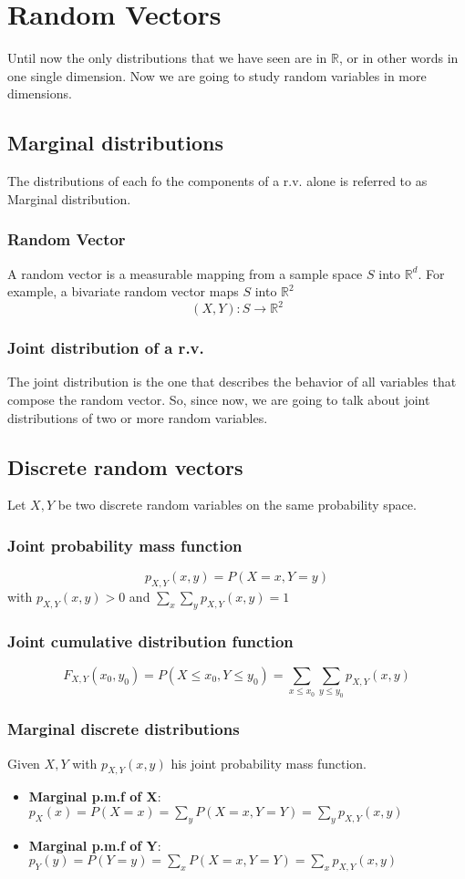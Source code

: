
\section{Random Vectors}
Until now the only distributions that we have seen are in $\mathbb{R}$, or in other words
in one single dimension. Now we are going to study random variables in more dimensions.
\subsection{Marginal distributions}
The distributions of each fo the components of a r.v. alone is referred to as Marginal
distribution.


 \subsubsection{Random Vector}
 A random vector is a measurable mapping from a sample space $S$ into $\mathbb{R}^d$. For
 example, a bivariate random vector maps $S$ into $\mathbb{R}^2$
 \[ (X,Y):S\rightarrow\mathbb{R}^2 \]

 \subsubsection{Joint distribution of a r.v.}
The joint distribution is the one that describes the behavior of all variables that
compose the random vector. So, since now, we are going to talk about joint distributions
of two or more random variables.

\subsection{Discrete random vectors}
Let $X, Y$ be two discrete random variables on the same probability space.

\subsubsection{Joint probability mass function}
\[ p_{X,Y}(x,y)=P(X=x,Y=y) \]
with $p_{X,Y}(x,y)>0$ and $\sum_x\sum_yp_{X,Y}(x,y)=1$
\subsubsection{Joint cumulative distribution function}
\[ F_{X,Y}(x_0,y_0)=P(X\leq x_0,Y\leq y_0) = \sum_{x\leq x_0}\sum_{y\leq y_0}p_{X,Y}(x,y) \]
\subsubsection{Marginal discrete distributions}
Given $X, Y$ with $p_{X,Y}(x,y)$ his joint probability mass function.
\begin{itemize}
    \item \textbf{Marginal p.m.f of X}: $p_X(x)=P(X=x)=\sum_yP(X=x,Y=Y)=\sum_yp_{X,Y}(x,y)$
    \item \textbf{Marginal p.m.f of Y}: $p_Y(y)=P(Y=y)=\sum_xP(X=x,Y=Y)=\sum_xp_{X,Y}(x,y)$
\end{itemize}


